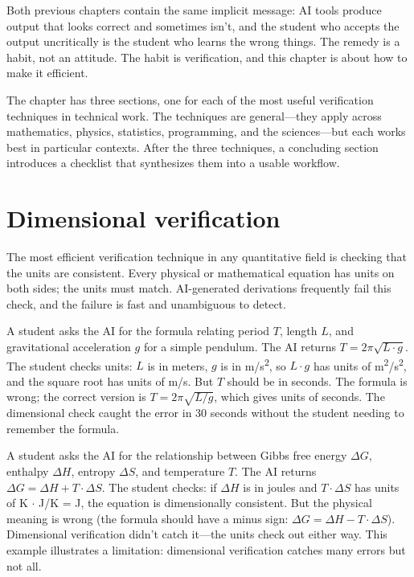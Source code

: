 \documentclass[11pt]{book}
\begin{document}
\medskip

Both previous chapters contain the same implicit message: AI tools produce output that looks correct and sometimes isn't, and the student who accepts the output uncritically is the student who learns the wrong things. The remedy is a habit, not an attitude. The habit is verification, and this chapter is about how to make it efficient.

The chapter has three sections, one for each of the most useful verification techniques in technical work. The techniques are general---they apply across mathematics, physics, statistics, programming, and the sciences---but each works best in particular contexts. After the three techniques, a concluding section introduces a checklist that synthesizes them into a usable workflow.

\section{Dimensional verification}

The most efficient verification technique in any quantitative field is checking that the units are consistent. Every physical or mathematical equation has units on both sides; the units must match. AI-generated derivations frequently fail this check, and the failure is fast and unambiguous to detect.

\begin{example}
A student asks the AI for the formula relating period $T$, length $L$, and gravitational acceleration $g$ for a simple pendulum. The AI returns $T = 2\pi \sqrt{L \cdot g}$. The student checks units: $L$ is in meters, $g$ is in m/s\textsuperscript{2}, so $L \cdot g$ has units of m\textsuperscript{2}/s\textsuperscript{2}, and the square root has units of m/s. But $T$ should be in seconds. The formula is wrong; the correct version is $T = 2\pi \sqrt{L/g}$, which gives units of seconds. The dimensional check caught the error in 30 seconds without the student needing to remember the formula.
\end{example}

\begin{example}
A student asks the AI for the relationship between Gibbs free energy $\Delta G$, enthalpy $\Delta H$, entropy $\Delta S$, and temperature $T$. The AI returns $\Delta G = \Delta H + T \cdot \Delta S$. The student checks: if $\Delta H$ is in joules and $T \cdot \Delta S$ has units of K $\cdot$ J/K = J, the equation is dimensionally consistent. But the physical meaning is wrong (the formula should have a minus sign: $\Delta G = \Delta H - T \cdot \Delta S$). Dimensional verification didn't catch it---the units check out either way. This example illustrates a limitation: dimensional verification catches many errors but not all.
\end{example}
\end{document}
